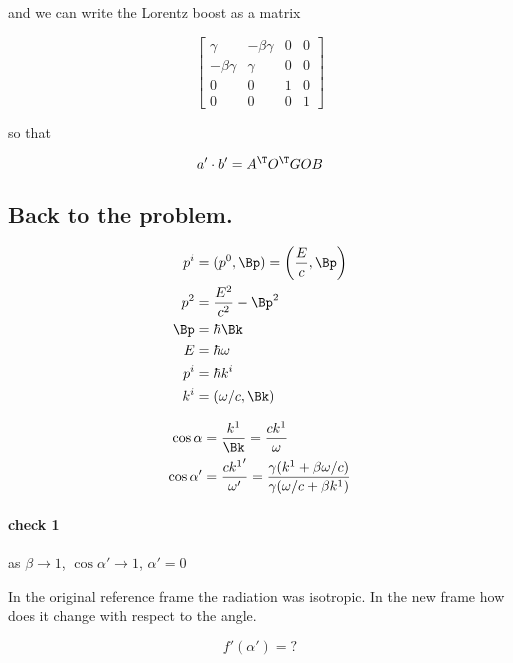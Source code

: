 and we can write the Lorentz boost as a matrix

\begin{equation}\label{eqn:relativisticElectrodynamicsT1:110}
\begin{bmatrix}
\gamma & -\beta \gamma & 0 & 0 \\
-\beta \gamma & \gamma & 0 & 0 \\
0 & 0 & 1 & 0 \\
0 & 0 & 0 & 1 
\end{bmatrix}
\end{equation}

so that 

\begin{equation}\label{eqn:relativisticElectrodynamicsT1:120}
a' \cdot b' = A^\T O^\T G O B
\end{equation}

\subsection{Back to the problem.}

\begin{align}\label{eqn:relativisticElectrodynamicsT1:130}
p^i &= (p^0, \Bp) = \left( \frac{E}{c}, \Bp\right) \\
p^2 &= \frac{E^2}{c^2} -\Bp^2 \\
\Bp &= \hbar \Bk \\
E &= \hbar \omega \\
p^i &= \hbar k^i \\
k^i &= (\omega/c, \Bk)
\end{align}

\begin{align}\label{eqn:relativisticElectrodynamicsT1:140} 
\cos \alpha &= \frac{k^1}{\Bk} = \frac{c k^1}{\omega} \\
\cos \alpha' &= \frac{c {k^1}'}{\omega'} = \frac{\gamma (k^1 + \beta \omega/c)}{\gamma(\omega/c + \beta k^1)}
\end{align}

\paragraph{check 1}

as $\beta \rightarrow 1$, $\cos \alpha' \rightarrow 1$, $\alpha' = 0$

In the original reference frame the radiation was isotropic.  In the new frame how does it change with respect to the angle.

\begin{equation}\label{eqn:relativisticElectrodynamicsT1:150}
f'(\alpha') = ?
\end{equation}

